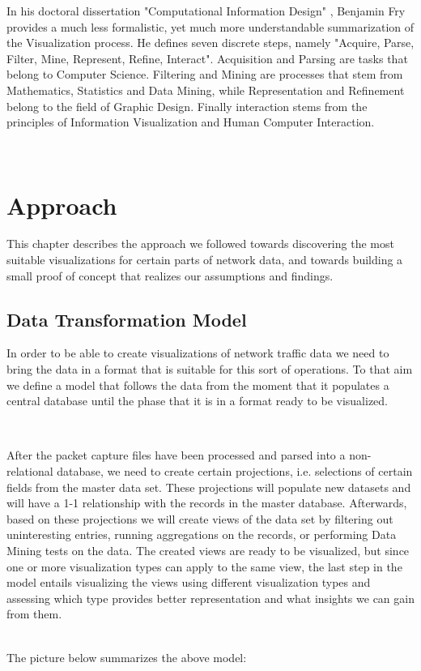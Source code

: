 \documentclass[16pt]{extreport}
\begin{document}
\parbox{\linewidth}{
\justify
\large{In his doctoral dissertation "Computational Information Design" \cite{fry1}, Benjamin Fry provides a much less formalistic, yet much more understandable summarization of the Visualization process. He defines seven discrete steps, namely "Acquire, Parse, Filter, Mine, Represent, Refine, Interact". Acquisition and Parsing are tasks that belong to Computer Science. Filtering and Mining are processes that stem from Mathematics, Statistics and Data Mining, while Representation and Refinement belong to the field of Graphic Design. Finally interaction stems from the principles of Information Visualization and Human Computer Interaction. }}

\hfill \break\\

\chapter{Approach}
\parbox{\linewidth}{
\justify
\large{
This chapter describes the approach we followed towards discovering the most suitable visualizations for certain parts of network data, and towards building a small proof of concept that realizes our assumptions and findings. 
}}

\section{Data Transformation Model}
\parbox{\linewidth}{
\justify
\large{
In order to be able to create visualizations of network traffic data we need to bring the data in a format that is suitable for this sort of operations. To that aim we define a model that follows the data from the moment that it populates a central database until the phase that it is in a format ready to be visualized.}}
\hfill \break\\
\parbox{\linewidth}{
\justify
\large{
After the packet capture files have been processed and parsed into a non-relational database, we need to create certain projections, i.e. selections of certain fields from the master data set. These projections will populate new datasets and will have a 1-1 relationship with the records in the master database. Afterwards, based on these projections we will create views of the data set by filtering out uninteresting entries, running aggregations on the records, or performing Data Mining tests on the data. The created views are ready to be visualized, but since one or more visualization types can apply to the same view, the last step in the model entails visualizing the views using different visualization types and assessing which type provides better representation and what insights we can gain from them.}}
\hfill \break\\
The picture below summarizes the above model:
\end{document}
